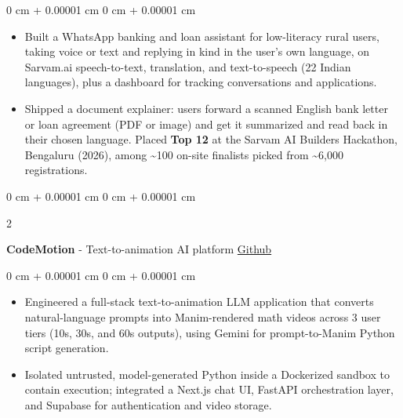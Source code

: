 \documentclass[10pt, letterpaper]{article}
\newenvironment{highlights}{
    \begin{itemize}[
        topsep=0.10 cm,
        parsep=0.10 cm,
        partopsep=0pt,
        itemsep=0pt,
        leftmargin=0 cm + 10pt
    ]
}{
    \end{itemize}
} %
\newenvironment{onecolentry}{
    \begin{adjustwidth}{
        0 cm + 0.00001 cm
    }{
        0 cm + 0.00001 cm
    }
}{
    \end{adjustwidth}
} %
\newenvironment{twocolentry}[2][]{
    \onecolentry
    \def\secondColumn{#2}
    \setcolumnwidth{\fill, 4.5 cm}
    \begin{paracol}{2}
}{
    \switchcolumn \raggedleft \secondColumn
    \end{paracol}
    \endonecolentry
} %
\begin{document}
        \vspace{0.10 cm}
        \begin{onecolentry}
            \begin{highlights}
                \item Built a WhatsApp banking and loan assistant for low-literacy rural users, taking voice or text and replying in kind in the user's own language, on Sarvam.ai speech-to-text, translation, and text-to-speech (22 Indian languages), plus a dashboard for tracking conversations and applications.
                \item Shipped a document explainer: users forward a scanned English bank letter or loan agreement (PDF or image) and get it summarized and read back in their chosen language. Placed \textbf{Top 12} at the Sarvam AI Builders Hackathon, Bengaluru (2026), among \textasciitilde100 on-site finalists picked from \textasciitilde6,000 registrations.
            \end{highlights}
        \end{onecolentry}

        \vspace{0.2 cm}

        \begin{twocolentry}{
            \href{https://github.com/vinaypokharkar/CodeMotion}{Github}
        }
            \textbf{CodeMotion} - Text-to-animation AI platform \end{twocolentry}

        \vspace{0.10 cm}
        \begin{onecolentry}
            \begin{highlights}
                \item Engineered a full-stack text-to-animation LLM application that converts natural-language prompts into Manim-rendered math videos across 3 user tiers (10s, 30s, and 60s outputs), using Gemini for prompt-to-Manim Python script generation.
                \item Isolated untrusted, model-generated Python inside a Dockerized sandbox to contain execution; integrated a Next.js chat UI, FastAPI orchestration layer, and Supabase for authentication and video storage.
            \end{highlights}
        \end{onecolentry}

        \vspace{0.2 cm}
\end{document}
